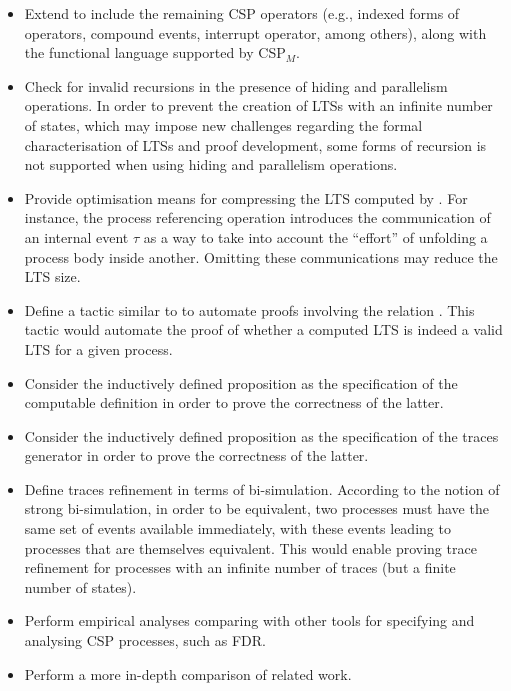 \begin{itemize}
	\item Extend \CSPcoq{} to include the remaining CSP operators (e.g., indexed forms of operators, compound events, interrupt operator, among others), along with the functional language supported by CSP$_{M}$.
	
	\item Check for invalid recursions in the presence of hiding and parallelism operations. In order to prevent the creation of LTSs with an infinite number of states, which may impose new challenges regarding the formal characterisation of LTSs and proof development, some forms of recursion is not supported when using hiding and parallelism operations.
	
	\item Provide optimisation means for compressing the LTS computed by . For instance, the process referencing operation introduces the communication of an internal event $ \tau $ as a way to take into account the ``effort'' of unfolding a process body inside another. Omitting these communications may reduce the LTS size.
	
	\item Define a tactic similar to  to automate proofs involving the relation . This tactic would automate the proof of whether a computed LTS is indeed a valid LTS for a given process.
	
	\item Consider the inductively defined proposition  as the specification of the computable definition  in order to prove the correctness of the latter.
	
	\item Consider the inductively defined proposition  as the specification of the traces generator  in order to prove the correctness of the latter.
	
	\item Define traces refinement in terms of bi-simulation. According to the notion of strong bi-simulation, in order to be equivalent, two processes must have the same set of events available immediately, with these events leading to processes that are themselves equivalent. This would enable proving trace refinement for processes with an infinite number of traces (but a finite number of states).
	
	\item Perform empirical analyses comparing \CSPcoq{} with other tools for specifying and analysing CSP processes, such as FDR.

	\item Perform a more in-depth comparison of related work.
	
\end{itemize}